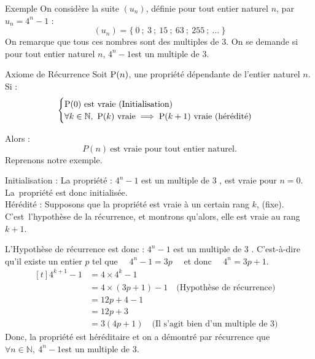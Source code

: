 \documentclass{coursbook}
\begin{document}
    \begin{Gpartie}{Exemple}
        On considère la suite $\left(u_n\right)$, définie pour tout entier naturel $n$, par\quad$u_n=4^n-1$ :
            \[\left(u_n\right)=\big\{~0~;~3~;~15~;~63~;~255~;~\dotso~\big\}\]
        On remarque que tous ces nombres sont des multiples de 3. On se demande si pour tout entier naturel $n$, \quad$4^n-1$\quad est un multiple de 3.
    \end{Gpartie}
    \begin{Gpartie}{Axiome de Récurrence}
        Soit $\mathrm{P}(n)$, une propriété dépendante de l'entier naturel $n$.\\
        Si :
        \[\begin{cases}
            \mathrm{P}(0)\text{ est vraie (Initialisation)} \\ \forall k\in\mathbb{N},~\mathrm{P}(k)\text{ vraie}\implies\mathrm{P}(k+1)\text{ vraie (hérédité)}
        \end{cases}\]

        Alors : \[P(n)~\text{est vraie pour tout entier naturel.}\]
        Reprenons notre exemple. 
        
        Initialisation : La propriété : \og $4^n-1$ est un multiple de 3 \fg{}, est vraie pour $n=0$. La~propriété est donc initialisée. \\ 
        Hérédité : Supposons que la propriété est vraie à un certain rang $k$, (fixe). C'est~l'hypothèse de la récurrence, et montrons qu'alors, elle est vraie au rang $k+1$.
        
        L'Hypothèse de récurrence est donc : \og $4^n-1$ est un multiple de 3 \fg{}. C'est-à-dire qu'il existe un entier $p$ tel que $\quad4^n-1=3p\quad$ et donc $\quad4^n=3p+1$.
        \vspace*{-1ex}\[\begin{aligned}[t]
            4^{k+1}-1&=4\times 4^k-1 &\\
            &= 4\times\left(3p+1\right)-1 \quad \text{(Hypothèse de récurrence)} &\\
            &=12p+4-1 &\\
            &=12p+3 &\\
            &=3\left(4p+1\right) \quad \text{(Il s'agit bien d'un multiple de 3)}
        \end{aligned}\]
        Donc, la propriété est héréditaire et on a démontré par récurrence que \quad$\forall n\in\mathbb{N},~4^n-1$\quad est un multiple de 3.
    \end{Gpartie}
\end{document}
